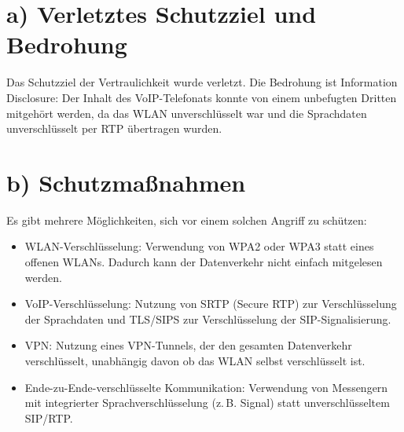 \documentclass[
	fontsize=12pt,          %
	paper=a4,               %
	numbers=noenddot,       %
	listof=totoc,           %
	listof=entryprefix,     %
	listof=nochaptergap,    %
	bibliography=totoc,     %
	parskip=half,           %
	openany                 %
]{scrbook}
\begin{document}
\section*{a) Verletztes Schutzziel und Bedrohung}
Das Schutzziel der Vertraulichkeit wurde verletzt.
Die Bedrohung ist Information Disclosure: Der Inhalt des VoIP-Telefonats konnte von einem unbefugten Dritten mitgehört werden, da das WLAN unverschlüsselt war und die Sprachdaten unverschlüsselt per RTP übertragen wurden.

\section*{b) Schutzmaßnahmen}
Es gibt mehrere Möglichkeiten, sich vor einem solchen Angriff zu schützen:
\begin{itemize}
	\item WLAN-Verschlüsselung: Verwendung von WPA2 oder WPA3 statt eines offenen WLANs.
	Dadurch kann der Datenverkehr nicht einfach mitgelesen werden.
	\item VoIP-Verschlüsselung: Nutzung von SRTP (Secure RTP) zur Verschlüsselung der Sprachdaten und TLS/SIPS zur Verschlüsselung der SIP-Signalisierung.
	\item VPN: Nutzung eines VPN-Tunnels, der den gesamten Datenverkehr verschlüsselt, unabhängig davon ob das WLAN selbst verschlüsselt ist.
	\item Ende-zu-Ende-verschlüsselte Kommunikation: Verwendung von Messengern mit integrierter Sprachverschlüsselung (z.\,B. Signal) statt unverschlüsseltem SIP/RTP.
\end{itemize}


\end{document}
